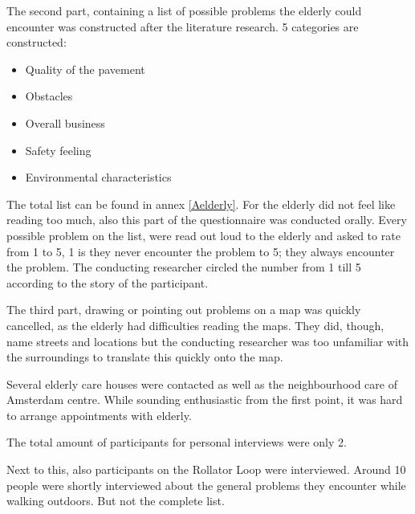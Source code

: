 The second part, containing a list of possible problems the elderly could encounter was constructed after the literature research. 5 categories are constructed:

\begin{itemize}
\item Quality of the pavement
\item Obstacles
\item Overall business
\item Safety feeling
\item Environmental characteristics
\end{itemize}

The total list can be found in annex \ref{Aelderly}. For the elderly did not feel like reading too much, also this part of the questionnaire was conducted orally. Every possible problem on the list, were read out loud to the elderly and asked to rate from 1 to 5, 1 is they never encounter the problem to 5; they always encounter the problem. The conducting researcher circled the number from 1 till 5 according to the story of the participant. 

The third part, drawing or pointing out problems on a map was quickly cancelled, as the elderly had difficulties reading the maps. They did, though, name streets and locations but the conducting researcher was too unfamiliar with the surroundings to translate this quickly onto the map. 

Several elderly care houses were contacted as well as the neighbourhood care of Amsterdam centre. While sounding enthusiastic from the first point, it was hard to arrange appointments with elderly. 

The total amount of participants for personal interviews were only 2. 

Next to this, also participants on the Rollator Loop were interviewed. Around 10 people were shortly interviewed about the general problems they encounter while walking outdoors. But not the complete list. 
